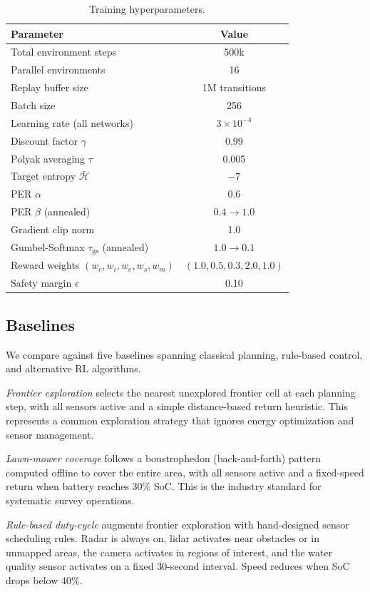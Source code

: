 \documentclass[conference]{IEEEtran}
\begin{document}
\begin{table}[t]
\centering
\caption{Training hyperparameters.}
\label{tab:hyperparams}
\scriptsize
\begin{tabular}{lc}
\toprule
\textbf{Parameter} & \textbf{Value} \\
\midrule
Total environment steps & 500k \\
Parallel environments & 16 \\
Replay buffer size & 1M transitions \\
Batch size & 256 \\
Learning rate (all networks) & $3 \times 10^{-4}$ \\
Discount factor $\gamma$ & 0.99 \\
Polyak averaging $\tau$ & 0.005 \\
Target entropy $\bar{\mathcal{H}}$ & $-7$ \\
PER $\alpha$ & 0.6 \\
PER $\beta$ (annealed) & $0.4 \rightarrow 1.0$ \\
Gradient clip norm & 1.0 \\
Gumbel-Softmax $\tau_{\text{gs}}$ (annealed) & $1.0 \rightarrow 0.1$ \\
Reward weights $(w_c, w_i, w_e, w_s, w_m)$ & $(1.0, 0.5, 0.3, 2.0, 1.0)$ \\
Safety margin $\epsilon$ & 0.10 \\
\bottomrule
\end{tabular}
\end{table}


\subsection{Baselines}

We compare against five baselines spanning classical planning, rule-based control, and alternative RL algorithms.

\textit{Frontier exploration} selects the nearest unexplored frontier cell at each planning step, with all sensors active and a simple distance-based return heuristic. This represents a common exploration strategy that ignores energy optimization and sensor management.

\textit{Lawn-mower coverage} follows a boustrophedon (back-and-forth) pattern computed offline to cover the entire area, with all sensors active and a fixed-speed return when battery reaches 30\% SoC. This is the industry standard for systematic survey operations.

\textit{Rule-based duty-cycle} augments frontier exploration with hand-designed sensor scheduling rules. Radar is always on, lidar activates near obstacles or in unmapped areas, the camera activates in regions of interest, and the water quality sensor activates on a fixed 30-second interval. Speed reduces when SoC drops below 40\%.
\end{document}
